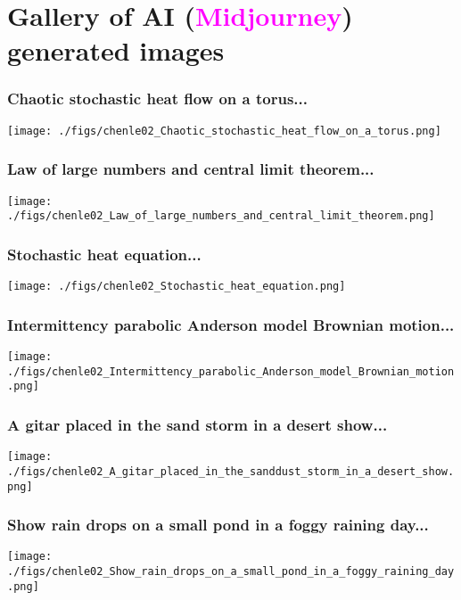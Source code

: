 \documentclass[9pt,xcolor=dvipsnames,table]{beamer}
\begin{document}
\section{Gallery of AI (\textcolor{magenta}{Midjourney}) generated images}
\begin{frame}[fragile,t] %
  \frametitle{Chaotic stochastic heat flow on a torus...}
  \begin{center}
    \texttt{[image: ./figs/chenle02\_Chaotic\_stochastic\_heat\_flow\_on\_a\_torus.png]}
  \end{center}
\end{frame}
\begin{frame}[fragile,t] %
  \frametitle{Law of large numbers and central limit theorem...}
  \begin{center}
    \texttt{[image: ./figs/chenle02\_Law\_of\_large\_numbers\_and\_central\_limit\_theorem.png]}
  \end{center}
\end{frame}
\begin{frame}[fragile,t] %
  \frametitle{Stochastic heat equation...}
  \begin{center}
    \texttt{[image: ./figs/chenle02\_Stochastic\_heat\_equation.png]}
  \end{center}
\end{frame}
\begin{frame}[fragile,t] %
  \frametitle{Intermittency parabolic Anderson model Brownian motion...}
  \begin{center}
    \texttt{[image: ./figs/chenle02\_Intermittency\_parabolic\_Anderson\_model\_Brownian\_motion.png]}
  \end{center}
\end{frame}
\begin{frame}[fragile,t] %
  \frametitle{A gitar placed in the sand storm in a desert show...}
  \begin{center}
    \texttt{[image: ./figs/chenle02\_A\_gitar\_placed\_in\_the\_sanddust\_storm\_in\_a\_desert\_show.png]}
  \end{center}
\end{frame}
\begin{frame}[fragile,t] %
  \frametitle{Show rain drops on a small pond in a foggy raining day...}
  \begin{center}
    \texttt{[image: ./figs/chenle02\_Show\_rain\_drops\_on\_a\_small\_pond\_in\_a\_foggy\_raining\_day.png]}
  \end{center}
\end{frame}
\end{document}
